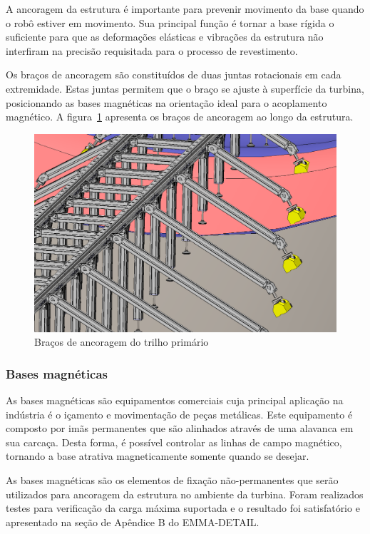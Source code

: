 A ancoragem da estrutura é importante para prevenir movimento da base quando o
robô estiver em movimento. Sua principal função é tornar a base rígida o
suficiente para que as deformações elásticas e vibrações da estrutura não
interfiram na precisão requisitada para o processo de revestimento.

Os braços de ancoragem são constituídos de duas juntas rotacionais em cada
extremidade. Estas juntas permitem que o braço se ajuste à superfície da
turbina, posicionando as bases magnéticas na orientação ideal para o acoplamento
magnético. A figura~\ref{fig::ancoragem} apresenta os braços de ancoragem ao
longo da estrutura.

\begin{figure}[h!]
	\centering
	\includegraphics[width=0.9\columnwidth]{figs/construcao/ancoragem}
	\caption{Braços de ancoragem do trilho primário}
    \label{fig::ancoragem}
\end{figure}

\subsubsection{Bases magnéticas}

As bases magnéticas são equipamentos comerciais cuja principal aplicação na
indústria é o içamento e movimentação de peças metálicas. Este equipamento é
composto por imãs permanentes que são alinhados através de uma alavanca em sua
carcaça. Desta forma, é possível controlar as linhas de campo magnético,
tornando a base atrativa magneticamente somente quando se desejar.

As bases magnéticas são os elementos de fixação não-permanentes que serão
utilizados para ancoragem da estrutura no ambiente da turbina. Foram realizados
testes para verificação da carga máxima suportada e o resultado foi
satisfatório e apresentado na seção de Apêndice B do EMMA-DETAIL.



